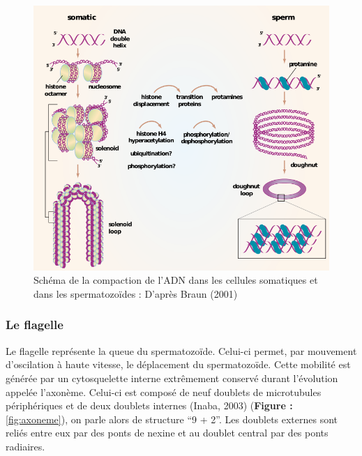 \documentclass[12pt,twoside]{reedthesis}
\theoremstyle{definition}
\theoremstyle{definition}
\theoremstyle{remark}
\begin{document}
  \begin{figure}
  
  {\centering \includegraphics[scale=.55]{figure/noyau} 
  
  }
  
  \caption[Schéma de la compaction de l’ADN dans les cellules somatiques et dans les spermatozoïdes]{Schéma de la compaction de l’ADN dans les cellules somatiques et dans les spermatozoïdes : D'après Braun (2001)}\label{fig:noyau}
  \end{figure}
  
  \subsubsection{Le flagelle}\label{le-flagelle}
  
  Le flagelle représente la queue du spermatozoïde. Celui-ci permet, par
  mouvement d'oscilation à haute vitesse, le déplacement du spermatozoïde.
  Cette mobilité est générée par un cytosquelette interne extrêmement
  conservé durant l'évolution appelée l'axonème. Celui-ci est composé de
  neuf doublets de microtubules périphériques et de deux doublets internes
  (Inaba, 2003) (\textbf{Figure : }\ref{fig:axoneme}), on parle alors de
  structure ``9 + 2''. Les doublets externes sont reliés entre eux par des
  ponts de nexine et au doublet central par des ponts radiaires.
  
\end{document}
